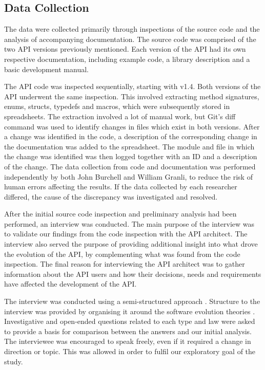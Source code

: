 \documentclass{sig-alternate}
\begin{document}
\subsection{Data Collection} \label{data_collection}  
The data were collected primarily through inspections of the source code and the analysis of accompanying documentation. The source code was comprised of the two API versions previously mentioned. Each version of the API had its own respective documentation, including example code, a library description and a basic development manual. 

The API code was inspected sequentially, starting with v1.4. Both versions of the API underwent the same inspection. This involved extracting method signatures, enums, structs, typedefs and macros, which were subsequently stored in spreadsheets. The extraction involved a lot of manual work, but Git's \cite{git} diff command was used to identify changes in files which exist in both versions. After a change was identified in the code, a description of the corresponding change in the documentation was added to the spreadsheet. The module and file in which the change was identified was then logged together with an ID and a description of the change. The data collection from code and documentation was performed independently by both John Burchell and William Granli, to reduce the risk of human errors affecting the results. If the data collected by each researcher differed, the cause of the discrepancy was investigated and resolved. 

After the initial source code inspection and preliminary analysis had been performed, an interview was conducted. The main purpose of the interview was to validate our findings from the code inspection with the API architect. The interview also served the purpose of providing additional insight into what drove the evolution of the API, by complementing what was found from the code inspection. The final reason for interviewing the API architect was to gather information about the API users and how their decisions, needs and requirements have affected the development of the API. 

The interview was conducted using a semi-structured approach \cite{robson2002real}. Structure to the interview was provided by organising it around the software evolution theories \cite{chapin2001types, lehman90sview}. Investigative and open-ended questions related to each type and law were asked to provide a basis for comparison between the answers and our initial analysis. The interviewee was encouraged to speak freely, even if it required a change in direction or topic. This was allowed in order to fulfil our exploratory goal of the study. 
\end{document}
